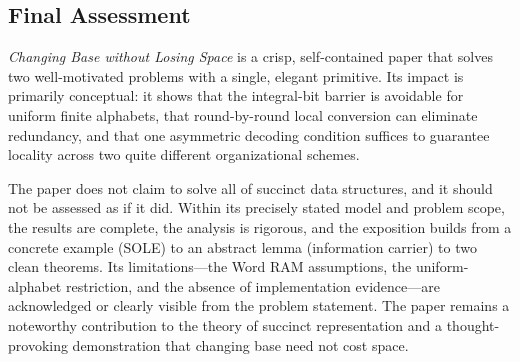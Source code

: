 \subsection{Final Assessment}

\textit{Changing Base without Losing Space} is a crisp, self-contained paper
that solves two well-motivated problems with a single, elegant primitive.
Its impact is primarily conceptual: it shows that the integral-bit barrier is
avoidable for uniform finite alphabets, that round-by-round local conversion
can eliminate redundancy, and that one asymmetric decoding condition suffices
to guarantee locality across two quite different organizational schemes.

The paper does not claim to solve all of succinct data structures, and it
should not be assessed as if it did.  Within its precisely stated model and
problem scope, the results are complete, the analysis is rigorous, and the
exposition builds from a concrete example (SOLE) to an abstract lemma
(information carrier) to two clean theorems.  Its limitations---the Word RAM
assumptions, the uniform-alphabet restriction, and the absence of
implementation evidence---are acknowledged or clearly visible from the
problem statement.  The paper remains a noteworthy contribution to the theory
of succinct representation and a thought-provoking demonstration that
changing base need not cost space.
